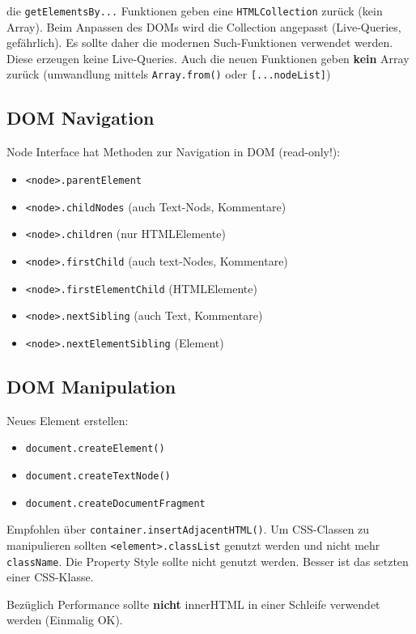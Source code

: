 \documentclass[11pt,twoside,landscape]{article}
\begin{document}
\begin{multicols}{4}
die \texttt{getElementsBy...} Funktionen geben eine \texttt{HTMLCollection} zurück (kein Array). Beim Anpassen des DOMs wird die Collection angepasst (Live-Queries, gefährlich). Es sollte daher die modernen Such-Funktionen verwendet werden. Diese erzeugen keine Live-Queries. Auch die neuen Funktionen geben \textbf{kein} Array zurück (umwandlung mittels \texttt{Array.from()} oder \texttt{[...nodeList]})

\subsection{DOM Navigation}
\label{sec:org7997a9b}
Node Interface hat Methoden zur Navigation in DOM (read-only!):
\begin{itemize}
\item \texttt{<node>.parentElement}
\item \texttt{<node>.childNodes} (auch Text-Nods, Kommentare)
\item \texttt{<node>.children} (nur HTMLElemente)
\item \texttt{<node>.firstChild} (auch text-Nodes, Kommentare)
\item \texttt{<node>.firstElementChild} (HTMLElemente)
\item \texttt{<node>.nextSibling} (auch Text, Kommentare)
\item \texttt{<node>.nextElementSibling} (Element)
\end{itemize}

\subsection{DOM Manipulation}
\label{sec:orgc84878d}
Neues Element erstellen:
\begin{itemize}
\item \texttt{document.createElement()}
\item \texttt{document.createTextNode()}
\item \texttt{document.createDocumentFragment}
\end{itemize}

Empfohlen über \texttt{container.insertAdjacentHTML()}. Um CSS-Classen zu manipulieren sollten \texttt{<element>.classList} genutzt werden und nicht mehr \texttt{className}. Die Property Style sollte nicht genutzt werden. Besser ist das setzten einer CSS-Klasse.

Bezüglich Performance sollte \textbf{nicht} innerHTML in einer Schleife verwendet werden (Einmalig OK).


\end{multicols}
\end{document}
